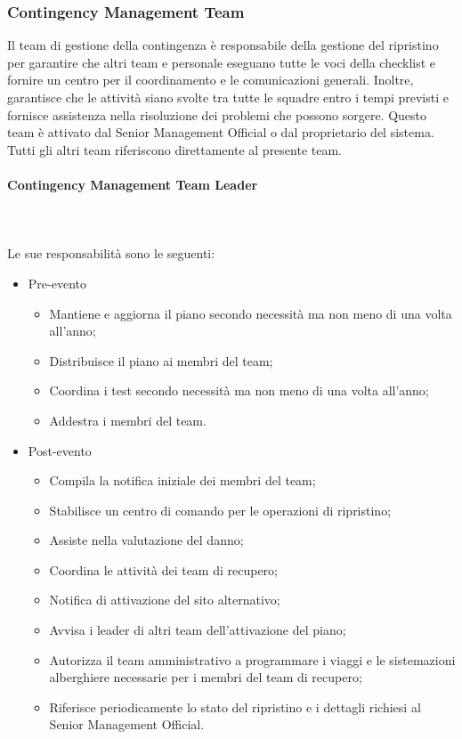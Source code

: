 \documentclass[12pt, a4paper, titlepage]{report}
\newcommand{\myparagraph}[1]{\paragraph{#1}\mbox{} \mbox{}}
\begin{document}
			\subsubsection{Contingency Management Team}
			Il team di gestione della contingenza è responsabile della gestione del ripristino per garantire che altri team e personale eseguano tutte le voci della checklist e fornire un centro per il coordinamento e le comunicazioni generali. Inoltre, garantisce che le attività siano svolte tra tutte le squadre entro i tempi previsti e fornisce assistenza nella risoluzione dei problemi che possono sorgere. Questo team è attivato dal Senior Management Official o dal proprietario del sistema. Tutti gli altri team riferiscono direttamente al presente team.
				\myparagraph{Contingency Management Team Leader}\\
				\\Le sue responsabilità sono le seguenti:
				\begin{itemize}
					\item Pre-evento
					\begin{itemize}
						\item Mantiene e aggiorna il piano secondo necessità ma non meno di una volta all'anno;
						\item Distribuisce il piano ai membri del team;
						\item Coordina i test secondo necessità ma non meno di una volta all'anno;
						\item Addestra i membri del team.
					\end{itemize}
					\item Post-evento
						\begin{itemize}
							\item Compila la notifica iniziale dei membri del team;
							\item Stabilisce un centro di comando per le operazioni di ripristino;
							\item Assiste nella valutazione del danno;
							\item Coordina le attività dei team di recupero;
							\item Notifica di attivazione del sito alternativo;
							\item Avvisa i leader di altri team dell'attivazione del piano;
							\item Autorizza il team amministrativo a programmare i viaggi e le sistemazioni alberghiere necessarie per i membri del team di recupero;
							\item Riferisce periodicamente lo stato del ripristino e i dettagli richiesi al Senior Management Official.
						\end{itemize}
				\end{itemize}
\end{document}

